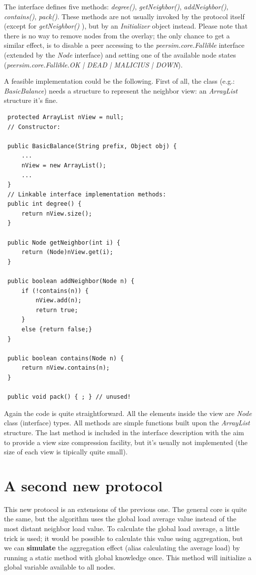 \documentclass[a4paper,12pt]{article}
\begin{document}
The interface defines five methods: \emph{degree()}, \emph{getNeighbor()},
\emph{addNeighbor()}, \emph{contains()}, \emph{pack()}. These methods
are not usually invoked by the protocol itself (except for \emph{getNeighbor()}
), but by an \emph{Initializer} object instead. Please note that there
is no way to remove nodes from the overlay; the only chance to get
a similar effect, is to disable a peer accessing to the \emph{peersim.core.Fallible}
interface (extended by the \emph{Node} interface) and setting one
of the available node states (\emph{peersim.core.Fallible.OK | DEAD | 
MALICIUS | DOWN}). 

A feasible implementation could be the following. First of all, the
class (e.g.: \emph{BasicBalance}) needs a structure to represent the
neighbor view: an \emph{ArrayList} structure it's fine.\\

\footnotesize
\begin{verbatim}
 protected ArrayList nView = null;
 // Constructor:
 
 public BasicBalance(String prefix, Object obj) {
     ...
     nView = new ArrayList();
     ...
 }
 // Linkable interface implementation methods:
 public int degree() {
     return nView.size();
 }
 
 public Node getNeighbor(int i) {
     return (Node)nView.get(i);
 } 
 
 public boolean addNeighbor(Node n) {
     if (!contains(n)) {
         nView.add(n);
         return true;
     }
     else {return false;}
 }
 
 public boolean contains(Node n) {
     return nView.contains(n);
 }
 
 public void pack() { ; } // unused!
\end{verbatim}
\normalsize

Again the code is quite straightforward. All the elements inside the
view are \emph{Node} class (interface) types. All methods are simple
functions built upon the \emph{ArrayList} structure. The last method
is included in the interface description with the aim to provide a
view size compression facility, but it's usually not implemented (the
size of each view is tipically quite small).


\section{A second new protocol}

This new protocol is an extensions of the previous one. The general
core is quite the same, but the algorithm uses the global load average
value instead of the most distant neighbor load value. To calculate
the global load average, a little trick is used; it would be possible
to calculate this value using aggregation, but we can \textbf{simulate}
the aggregation effect (alias calculating the average load) by running
a static method with global knowledge once. This method will initialize
a global variable available to all nodes. 
\end{document}
